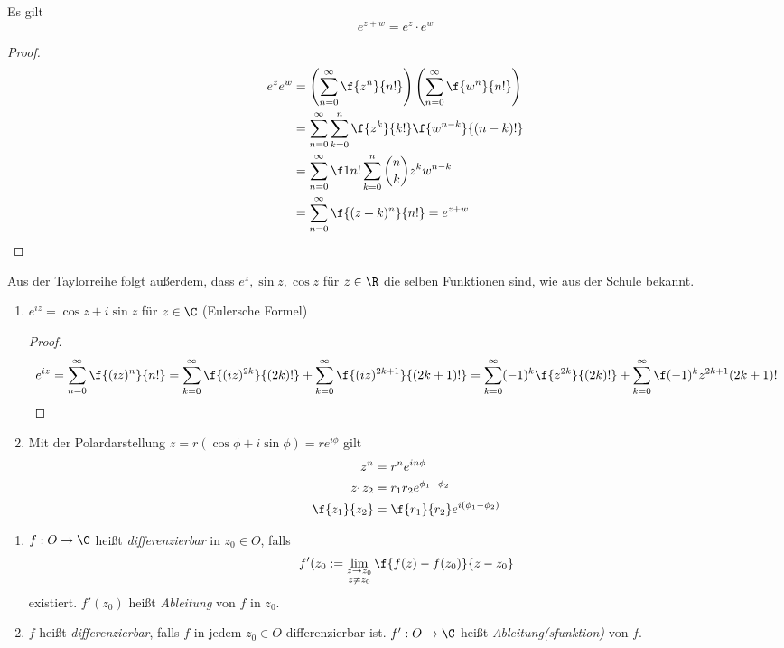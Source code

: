 \documentclass[a4paper,10pt]{scrartcl}
\begin{document}
\begin{prop}
	\label{prop:1.19}
	Es gilt
	\[
		e^{z+w}  = e^z\cdot e^w
	\]
	\begin{proof}
		\begin{align*}
			e^ze^w &= \left(\sum_{n=0}^\infty \f{z^n}{n!}\right) \left( \sum_{n=0}^\infty \f {w^n}{n!}\right) \\
				&= \sum_{n=0}^\infty \sum_{k=0}^n \f {z^k}{k!} \f {w^{n-k}}{(n-k)!} \\
				&= \sum_{n=0}^\infty \f 1{n!} \sum_{k=0}^n \binom{n}{k}z^k w^{n-k} \\
				&= \sum_{n=0}^\infty \f {(z+k)^n}{n!} = e^{z+w}
		\end{align*}
	\end{proof}
\end{prop}

\begin{nt}
	\label{1.20}
	Aus der Taylorreihe folgt außerdem, dass $e^z, \sin z, \cos z$ für $z\in \R$ die selben Funktionen sind, wie aus der Schule bekannt.
\end{nt}

\begin{prop}
	\label{1.21}
	\begin{enumerate}[1)]
		\item 
			$e^{iz} = \cos z + i \sin z$ für $z\in \C$ (Eulersche Formel)
			\begin{proof}
				\[
					e^{iz} = \sum_{n=0}^\infty \f {(iz)^n}{n!} = \sum_{k=0}^\infty \f {(iz)^{2k}}{(2k)!} + \sum_{k=0}^\infty \f {(iz)^{2k+1}}{(2k+1)!} =
\sum_{k=0}^\infty (-1)^k\f {z^{2k}}{(2k)!} + \sum_{k=0}^\infty \f (-1)^k {z^{2k+1}}{(2k+1)!}
\]
			\end{proof}
		\item
			Mit der Polardarstellung $z = r(\cos \phi + i \sin \phi) = r e^{i\phi}$ gilt
			\begin{align*}
				z^n &= r^n e^{in\phi}\\
				z_1 z_2 &= r_1 r_2 e^{\phi_1 + \phi_2}\\
				\f {z_1}{z_2} &= \f {r_1}{r_2} e^{i(\phi_1-\phi_2)}
			\end{align*}
	\end{enumerate}
\end{prop}

\begin{df}
	\label{df:1.22}
	\begin{enumerate}[1)]
		\item 
			$f: O \to \C$ heißt \emph{differenzierbar} in $z_0\in O$, falls
			\[
				f'(z_0 := \lim_{\substack{z\to z_0 \\ z\neq z_0}}\f {f(z) -f(z_0)}{z-z_0}
			\]
			existiert.
			$f'(z_0)$ heißt \emph{Ableitung} von $f$ in $z_0$.
		\item
			$f$ heißt \emph{differenzierbar}, falls $f$ in jedem $z_0\in O$ differenzierbar ist.
			$f':O\to \C$ heißt \emph{Ableitung(sfunktion)} von $f$.
	\end{enumerate}
\end{df}
\end{document}
